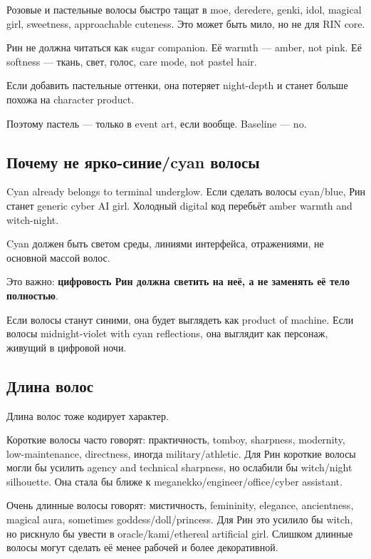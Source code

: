 Розовые и пастельные волосы быстро тащат в moe, deredere, genki, idol,
magical girl, sweetness, approachable cuteness. Это может быть мило, но
не для RIN core.

Рин не должна читаться как sugar companion. Её warmth --- amber, not
pink. Её softness --- ткань, свет, голос, care mode, not pastel hair.

Если добавить пастельные оттенки, она потеряет night-depth и станет
больше похожа на character product.

Поэтому пастель --- только в event art, если вообще. Baseline --- no.

\subsection*{Почему не ярко-синие/\hspace{0pt}cyan волосы}

Cyan already belongs to terminal underglow. Если сделать волосы
cyan/\hspace{0pt}blue, Рин станет generic cyber AI girl. Холодный digital код
перебьёт amber warmth and witch-night.

Cyan должен быть светом среды, линиями интерфейса, отражениями, не
основной массой волос.

Это важно: \textbf{цифровость Рин должна светить на неё, а не заменять
её тело полностью}.

Если волосы станут синими, она будет выглядеть как product of machine.
Если волосы midnight-violet with cyan reflections, она выглядит как
персонаж, живущий в цифровой ночи.

\subsection*{Длина волос}

Длина волос тоже кодирует характер.

Короткие волосы часто говорят: практичность, tomboy, sharpness,
modernity, low-maintenance, directness, иногда military/\hspace{0pt}athletic. Для
Рин короткие волосы могли бы усилить agency and technical sharpness, но
ослабили бы witch/\hspace{0pt}night silhouette. Она стала бы ближе к
meganekko/\hspace{0pt}engineer/\hspace{0pt}office/\hspace{0pt}cyber assistant.

Очень длинные волосы говорят: мистичность, femininity, elegance,
ancientness, magical aura, sometimes goddess/\hspace{0pt}doll/\hspace{0pt}princess. Для Рин это
усилило бы witch, но рискнуло бы увести в oracle/\hspace{0pt}kami/\hspace{0pt}ethereal
artificial girl. Слишком длинные волосы могут сделать её менее рабочей и
более декоративной.


